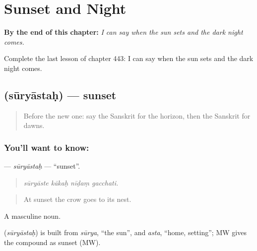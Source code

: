 
\chapter{Sunset and Night}
\label{ch:sa-sunset-and-night}

\begin{chapteropening}
\textbf{By the end of this chapter:} \emph{I can say when the sun sets and the dark night comes.}

Complete the last lesson of chapter 443: I can say when the sun sets and the dark night comes.
\end{chapteropening}

\section[\texorpdfstring{\sk{सूर्यास्तः} (sūryāstaḥ)}{सूर्यास्तः (sūryāstaḥ)}]{ (sūryāstaḥ) — sunset}

\label{lesson:SA-C443-suryastah}



\begin{quote}
Before the new one: say the Sanskrit for the horizon, then the Sanskrit for dawns.
\end{quote}

\subsection*{You'll want to know: }
\textbf{} — \emph{sūryāstaḥ} — \textquotedblleft{}sunset\textquotedblright{}.

\begin{quote}
   
\end{quote}

\begin{quote}
\emph{sūryāste kākaḥ nīḍaṃ gacchati.}
\end{quote}

\begin{quote}
At sunset the crow goes to its nest.
\end{quote}

A masculine noun.

\begin{cousinweb}
\textbf{} (\emph{sūryāstaḥ}) is built from \emph{sūrya}, \textquotedblleft{}the sun\textquotedblright{}, and \emph{asta}, \textquotedblleft{}home, setting\textquotedblright{}; MW gives the compound as sunset (MW).
\end{cousinweb}


